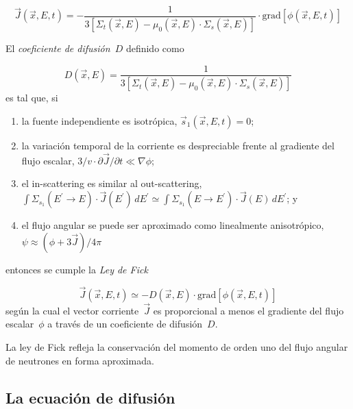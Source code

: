 \begin{equation*}
 \vec{J}(\vec{x}, E, t) = -\frac{1}{3 \left[ \Sigma_t(\vec{x}, E) - \mu_0(\vec{x}, E) \cdot \Sigma_s(\vec{x},E) \right] } \cdot \text{grad} \left[ \phi(\vec{x}, E,t ) \right]
\end{equation*}

\begin{definicion}
El \emph{coeficiente de difusión}~$D$ definido como

\begin{equation*}
 D(\vec{x}, E) = \frac{1}{3 \left[ \Sigma_t(\vec{x}, E) - \mu_0(\vec{x}, E) \cdot \Sigma_s(\vec{x},E) \right] }
\end{equation*}
%
es tal que, si

 \begin{enumerate}
  \item la fuente independiente es isotrópica, $\vec{s}_1(\vec{x}, E, t)=0$;
  \item la variación temporal de la corriente es despreciable frente al gradiente del flujo escalar, $3/v  \cdot \partial \vec{J}/\partial t \ll \nabla \phi$;
  \item el in-scattering es similar al out-scattering, $\int \Sigma_{s_1}(E^\prime \rightarrow E) \cdot \vec{J}(E^\prime) \, dE^\prime
\simeq
\int \Sigma_{s_1}(E \rightarrow E^\prime) \cdot \vec{J}(E) \, dE^\prime$; y
  \item el flujo angular se puede ser aproximado como linealmente anisotrópico, $\psi \approx (\phi + 3\vec{J})/4\pi$
 \end{enumerate}
%
entonces se cumple la \emph{Ley de Fick}

\begin{equation}\label{eq:fick}
 \vec{J}(\vec{x}, E, t) \simeq - D(\vec{x}, E) \cdot \text{grad} \left[ \phi(\vec{x}, E, t) \right]
\end{equation}
%
según la cual el vector corriente~$\vec{J}$ es proporcional a menos el gradiente del flujo escalar~$\phi$ a través de un coeficiente de difusión~$D$.
\end{definicion}

La ley de Fick refleja la conservación del momento de orden uno del flujo angular de neutrones en forma aproximada.




\subsection{La ecuación de difusión} %

